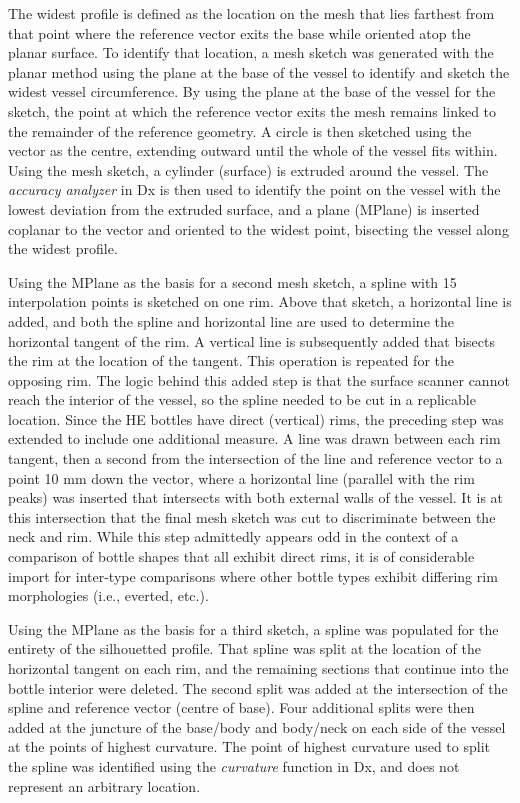 \documentclass[review]{elsarticle}
\begin{document}
The widest profile is defined as the location on the mesh that lies farthest from that point where the reference vector exits the base while oriented atop the planar surface. To identify that location, a mesh sketch was generated with the planar method using the plane at the base of the vessel to identify and sketch the widest vessel circumference. By using the plane at the base of the vessel for the sketch, the point at which the reference vector exits the mesh remains linked to the remainder of the reference geometry. A circle is then sketched using the vector as the centre, extending outward until the whole of the vessel fits within. Using the mesh sketch, a cylinder (surface) is extruded around the vessel. The \textit{accuracy analyzer} in Dx is then used to identify the point on the vessel with the lowest deviation from the extruded surface, and a plane (MPlane) is inserted coplanar to the vector and oriented to the widest point, bisecting the vessel along the widest profile.

Using the MPlane as the basis for a second mesh sketch, a spline with 15 interpolation points is sketched on one rim. Above that sketch, a horizontal line is added, and both the spline and horizontal line are used to determine the horizontal tangent of the rim. A vertical line is subsequently added that bisects the rim at the location of the tangent. This operation is repeated for the opposing rim. The logic behind this added step is that the surface scanner cannot reach the interior of the vessel, so the spline needed to be cut in a replicable location. Since the HE bottles have direct (vertical) rims, the preceding step was extended to include one additional measure. A line was drawn between each rim tangent, then a second from the intersection of the line and reference vector to a point 10 mm down the vector, where a horizontal line (parallel with the rim peaks) was inserted that intersects with both external walls of the vessel. It is at this intersection that the final mesh sketch was cut to discriminate between the neck and rim. While this step admittedly appears odd in the context of a comparison of bottle shapes that all exhibit direct rims, it is of considerable import for inter-type comparisons where other bottle types exhibit differing rim morphologies (i.e., everted, etc.).

Using the MPlane as the basis for a third sketch, a spline was populated for the entirety of the silhouetted profile. That spline was split at the location of the horizontal tangent on each rim, and the remaining sections that continue into the bottle interior were deleted. The second split was added at the intersection of the spline and reference vector (centre of base). Four additional splits were then added at the juncture of the base/body and body/neck on each side of the vessel at the points of highest curvature. The point of highest curvature used to split the spline was identified using the \textit{curvature} function in Dx, and does not represent an arbitrary location.
\end{document}
